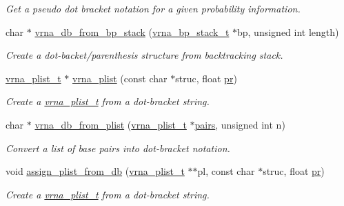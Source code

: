 \begin{DoxyCompactItemize}
\begin{DoxyCompactList}\small\item\em Get a pseudo dot bracket notation for a given probability information. \end{DoxyCompactList}\item 
char $\ast$ \hyperlink{group__struct__utils_ga27bea2c241564af53a065982183389df}{vrna\+\_\+db\+\_\+from\+\_\+bp\+\_\+stack} (\hyperlink{group__data__structures_gaa651bda42e7692f08cb603cd6834b0ee}{vrna\+\_\+bp\+\_\+stack\+\_\+t} $\ast$bp, unsigned int length)
\begin{DoxyCompactList}\small\item\em Create a dot-\/backet/parenthesis structure from backtracking stack. \end{DoxyCompactList}\item 
\hyperlink{group__data__structures_ga8e4eb5e1bfc95776559575beb359af87}{vrna\+\_\+plist\+\_\+t} $\ast$ \hyperlink{group__struct__utils_gad4448f5d2c2da0e4ab1731a3586b2542}{vrna\+\_\+plist} (const char $\ast$struc, float \hyperlink{fold__vars_8h_ac98ec419070aee6831b44e5c700f090f}{pr})
\begin{DoxyCompactList}\small\item\em Create a \hyperlink{group__data__structures_ga8e4eb5e1bfc95776559575beb359af87}{vrna\+\_\+plist\+\_\+t} from a dot-\/bracket string. \end{DoxyCompactList}\item 
char $\ast$ \hyperlink{group__struct__utils_gab6a7a36c90836880f7ab09b9f6baf1af}{vrna\+\_\+db\+\_\+from\+\_\+plist} (\hyperlink{group__data__structures_ga8e4eb5e1bfc95776559575beb359af87}{vrna\+\_\+plist\+\_\+t} $\ast$\hyperlink{group__struct__utils_ga6341cbb704924824e0236c1dce791032}{pairs}, unsigned int n)
\begin{DoxyCompactList}\small\item\em Convert a list of base pairs into dot-\/bracket notation. \end{DoxyCompactList}\item 
void \hyperlink{group__struct__utils_ga6f3031d77de925a7b4ca72e1d52dec2f}{assign\+\_\+plist\+\_\+from\+\_\+db} (\hyperlink{group__data__structures_ga8e4eb5e1bfc95776559575beb359af87}{vrna\+\_\+plist\+\_\+t} $\ast$$\ast$pl, const char $\ast$struc, float \hyperlink{fold__vars_8h_ac98ec419070aee6831b44e5c700f090f}{pr})
\begin{DoxyCompactList}\small\item\em Create a \hyperlink{group__data__structures_ga8e4eb5e1bfc95776559575beb359af87}{vrna\+\_\+plist\+\_\+t} from a dot-\/bracket string. \end{DoxyCompactList}\item 
$$
\end{DoxyCompactItemize}
